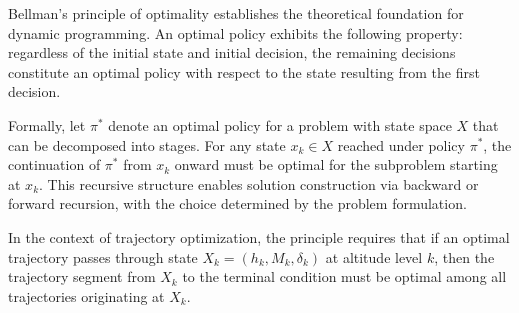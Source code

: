 Bellman's principle of optimality establishes the theoretical foundation for dynamic programming. An optimal policy exhibits the following property: regardless of the initial state and initial decision, the remaining decisions constitute an optimal policy with respect to the state resulting from the first decision.

Formally, let $\pi^*$ denote an optimal policy for a problem with state space $X$ that can be decomposed into stages. For any state $x_k \in X$ reached under policy $\pi^*$, the continuation of $\pi^*$ from $x_k$ onward must be optimal for the subproblem starting at $x_k$. This recursive structure enables solution construction via backward or forward recursion, with the choice determined by the problem formulation.

In the context of trajectory optimization, the principle requires that if an optimal trajectory passes through state $X_k = (h_k, M_k, \delta_k)$ at altitude level $k$, then the trajectory segment from $X_k$ to the terminal condition must be optimal among all trajectories originating at $X_k$.

